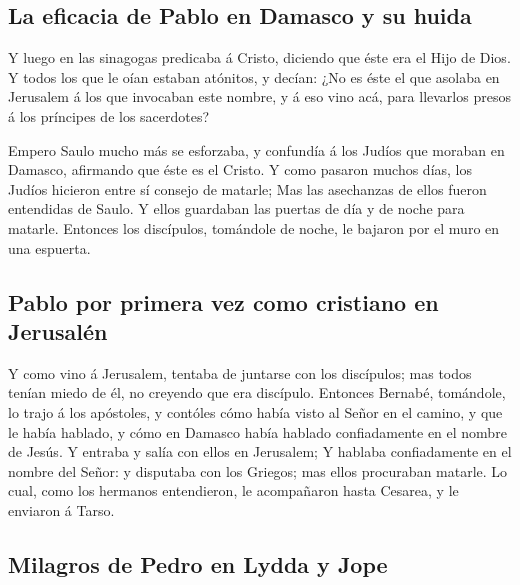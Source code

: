\hypertarget{la-eficacia-de-pablo-en-damasco-y-su-huida}{%
\subsection{La eficacia de Pablo en Damasco y su
huida}\label{la-eficacia-de-pablo-en-damasco-y-su-huida}}

 Y luego en las sinagogas predicaba á Cristo, diciendo
que éste era el Hijo de Dios.  Y todos los que le oían
estaban atónitos, y decían: ¿No es éste el que asolaba en Jerusalem á
los que invocaban este nombre, y á eso vino acá, para llevarlos presos á
los príncipes de los sacerdotes?

 Empero Saulo mucho más se esforzaba, y confundía á los
Judíos que moraban en Damasco, afirmando que éste es el Cristo.
 Y como pasaron muchos días, los Judíos hicieron entre sí
consejo de matarle;  Mas las asechanzas de ellos fueron
entendidas de Saulo. Y ellos guardaban las puertas de día y de noche
para matarle.  Entonces los discípulos, tomándole de
noche, le bajaron por el muro en una espuerta.

\hypertarget{pablo-por-primera-vez-como-cristiano-en-jerusaluxe9n}{%
\subsection{Pablo por primera vez como cristiano en
Jerusalén}\label{pablo-por-primera-vez-como-cristiano-en-jerusaluxe9n}}

 Y como vino á Jerusalem, tentaba de juntarse con los
discípulos; mas todos tenían miedo de él, no creyendo que era discípulo.
 Entonces Bernabé, tomándole, lo trajo á los apóstoles, y
contóles cómo había visto al Señor en el camino, y que le había hablado,
y cómo en Damasco había hablado confiadamente en el nombre de Jesús.
 Y entraba y salía con ellos en Jerusalem;
 Y hablaba confiadamente en el nombre del Señor: y
disputaba con los Griegos; mas ellos procuraban matarle. 
Lo cual, como los hermanos entendieron, le acompañaron hasta Cesarea, y
le enviaron á Tarso.

\hypertarget{milagros-de-pedro-en-lydda-y-jope}{%
\subsection{Milagros de Pedro en Lydda y
Jope}\label{milagros-de-pedro-en-lydda-y-jope}}

